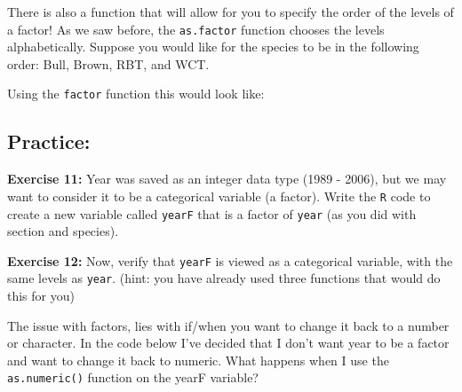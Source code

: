 \documentclass[]{article}
\newenvironment{Shaded}{\begin{snugshade}}{\end{snugshade}}
\newcommand{\KeywordTok}[1]{\textcolor[rgb]{0.13,0.29,0.53}{\textbf{#1}}}
\newcommand{\DataTypeTok}[1]{\textcolor[rgb]{0.13,0.29,0.53}{#1}}
\newcommand{\StringTok}[1]{\textcolor[rgb]{0.31,0.60,0.02}{#1}}
\newcommand{\OperatorTok}[1]{\textcolor[rgb]{0.81,0.36,0.00}{\textbf{#1}}}
\newcommand{\NormalTok}[1]{#1}
\begin{document}
There is also a function that will allow for you to specify the order of
the levels of a factor! As we saw before, the \texttt{as.factor}
function chooses the levels alphabetically. Suppose you would like for
the species to be in the following order: Bull, Brown, RBT, and WCT.

Using the \texttt{factor} function this would look like:

\vspace{0.25cm}

\begin{Shaded}
\end{Shaded}

\subsection{Practice:}\label{practice-1}

\textbf{Exercise 11:} Year was saved as an integer data type (1989 -
2006), but we may want to consider it to be a categorical variable (a
factor). Write the \texttt{R} code to create a new variable called
\texttt{yearF} that is a factor of \texttt{year} (as you did with
section and species).

\vspace{0.25cm}

\textbf{Exercise 12:} Now, verify that \texttt{yearF} is viewed as a
categorical variable, with the same levels as \texttt{year}. (hint: you
have already used three functions that would do this for you)

\vspace{0.25cm}

The issue with factors, lies with if/when you want to change it back to
a number or character. In the code below I've decided that I don't want
year to be a factor and want to change it back to numeric. What happens
when I use the \texttt{as.numeric()} function on the yearF variable?

\vspace{0.25cm}

\begin{Shaded}
\end{Shaded}
\end{document}
